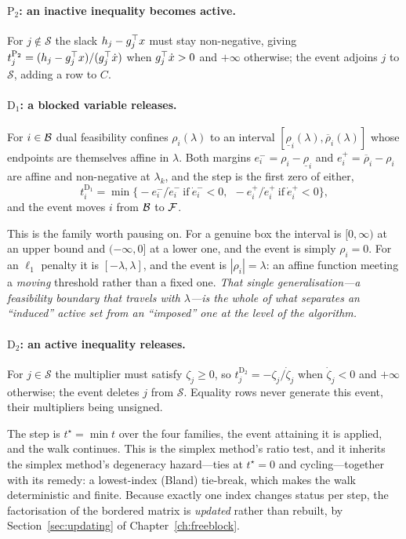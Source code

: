 \paragraph{$\mathrm{P}_2$: an inactive inequality becomes active.} For
$j \notin \mathcal{S}$ the slack $h_j - g_j^{\top} x$ must stay non-negative, giving
$t^{\mathrm{P}_2}_j = (h_j - g_j^{\top} x)/(g_j^{\top}\dot x)$ when $g_j^{\top}\dot x>0$ and
$+\infty$ otherwise; the event adjoins $j$ to $\mathcal{S}$, adding a row to $C$.

\paragraph{$\mathrm{D}_1$: a blocked variable releases.} For $i \in \mathcal{B}$ dual
feasibility confines $\rho_i(\lambda)$ to an interval
$[\underline\rho_i(\lambda), \overline\rho_i(\lambda)]$ whose endpoints are
themselves affine in $\lambda$. Both margins $e^-_i = \rho_i - \underline\rho_i$ and
$e^+_i = \overline\rho_i - \rho_i$ are affine and non-negative at $\lambda_k$, and
the step is the first zero of either,
\[
t^{\mathrm{D}_1}_i = \min\bigl\{ -e^-_i/\dot e^-_i \ \text{if}\ \dot e^-_i<0,\ \
-e^+_i/\dot e^+_i \ \text{if}\ \dot e^+_i<0 \bigr\},
\]
and the event moves $i$ from $\mathcal{B}$ to $\mathcal{F}$.

This is the family worth pausing on. For a genuine box the interval is
$[0,\infty)$ at an upper bound and $(-\infty,0]$ at a lower one, and the event is
simply $\rho_i = 0$. For an $\ell_1$ penalty it is $[-\lambda,\lambda]$, and the
event is $|\rho_i| = \lambda$: an affine function meeting a \emph{moving} threshold
rather than a fixed one. \emph{That single generalisation---a feasibility boundary
that travels with $\lambda$---is the whole of what separates an ``induced'' active
set from an ``imposed'' one at the level of the algorithm.}

\paragraph{$\mathrm{D}_2$: an active inequality releases.} For $j \in \mathcal{S}$
the multiplier must satisfy $\zeta_j \ge 0$, so
$t^{\mathrm{D}_2}_j = -\zeta_j/\dot\zeta_j$ when $\dot\zeta_j<0$ and $+\infty$
otherwise; the event deletes $j$ from $\mathcal{S}$. Equality rows never generate
this event, their multipliers being unsigned.

\medskip
The step is $t^\star = \min t$ over the four families, the event attaining it is
applied, and the walk continues. This is the simplex method's ratio test, and it
inherits the simplex method's degeneracy hazard---ties at $t^\star = 0$ and
cycling---together with its remedy: a lowest-index (Bland) tie-break, which makes
the walk deterministic and finite. Because exactly one index changes status per
step, the factorisation of the bordered matrix is \emph{updated} rather than
rebuilt, by Section~\ref{sec:updating} of Chapter~\ref{ch:freeblock}.

